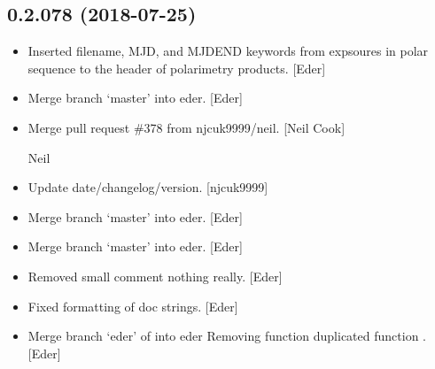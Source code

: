 \documentclass[a4paper,10pt,english]{report}
\begin{document}
\subsection{0.2.078 (2018-07-25)}
\label{\detokenize{misc/changelog:id386}}\begin{itemize}
\item {} 
Inserted filename, MJD, and MJDEND keywords from expsoures in polar
sequence to the header of polarimetry products. {[}Eder{]}

\item {} 
Merge branch ‘master’ into eder. {[}Eder{]}

\item {} 
Merge pull request \#378 from njcuk9999/neil. {[}Neil Cook{]}

Neil

\item {} 
Update date/changelog/version. {[}njcuk9999{]}

\item {} 
Merge branch ‘master’ into eder. {[}Eder{]}

\item {} 
Merge branch ‘master’ into eder. {[}Eder{]}

\item {} 
Removed small comment \textendash{} nothing really. {[}Eder{]}

\item {} 
Fixed formatting of doc strings. {[}Eder{]}

\item {} 
Merge branch ‘eder’ of  into
eder Removing function duplicated function . {[}Eder{]}

\end{itemize}
\end{document}
